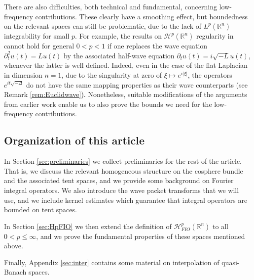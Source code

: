 \documentclass{amsart}
\newcommand {\HT}{\mathcal{H}}
\newcommand {\Hp}{\mathcal{H}^{p}_{FIO}(\Rn)}
\newcommand {\Rn}{\mathbb{R}^{n}}
\theoremstyle{definition}
\numberwithin{equation}{section}
\begin{document}
There are also difficulties, both technical and fundamental, concerning low-frequency contributions. These clearly have a smoothing effect, but boundedness on the relevant spaces can still be problematic, due to the lack of $L^{p}(\Rn)$ integrability for small $p$. For example, the results on $\HT^{p}(\Rn)$ regularity in \cite{LiRoSo25a} cannot hold for general $0<p<1$ if one replaces the wave equation $\partial_{t}^{2}u(t)=Lu(t)$ by the associated half-wave equation $\partial_{t}u(t)=i\sqrt{-L}u(t)$, whenever the latter is well defined. Indeed, even in the case of the flat Laplacian in dimension $n=1$, due to the singularity at zero of $\xi\mapsto e^{i|\xi|}$, 
the operators $e^{it\sqrt{-\Delta}}$ do not have the same mapping properties as their wave counterparts %
(see Remark \ref{rem:Euclidwave}). %
Nonetheless, suitable modifications of the arguments from earlier work enable us to also prove the bounds we need for the low-frequency contributions. 





\subsection{Organization of this article}

In Section \ref{sec:preliminaries} we collect preliminaries for the rest of the article. That is, we discuss the relevant homogeneous structure on the cosphere bundle and the associated tent spaces, and we provide some background on Fourier integral operators. We also introduce the wave packet transforms that we will use, and we include kernel estimates which guarantee that integral operators are bounded on tent spaces. 

In Section \ref{sec:HpFIO} we then extend the definition of $\Hp$ to all $0<p\leq \infty$, and we prove the fundamental properties of these spaces mentioned above. %

 Finally, Appendix \ref{sec:inter} contains some material on interpolation of quasi-Banach spaces. 
\end{document}
